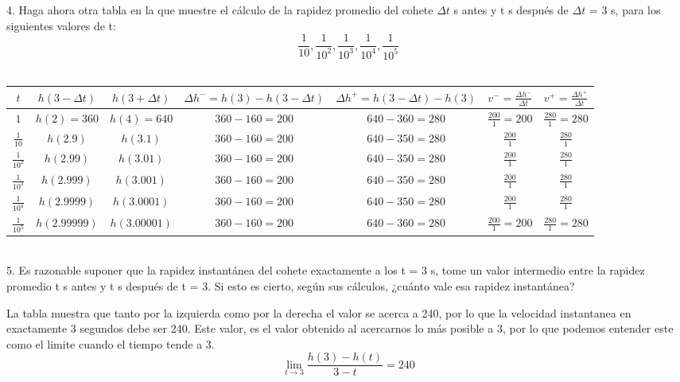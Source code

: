 \documentclass[12pt]{article}
\begin{document}
4. Haga ahora otra tabla en la que muestre el cálculo de la rapidez promedio del cohete $\Delta t$ s antes y t s después de $\Delta t $ = 3 s, para los siguientes valores de t:
\[
\frac{1}{10},\frac{1}{10 ^ 2} , \frac{1}{10 ^ 3}, \frac{1}{10 ^ 4}, \frac{1}{10 ^ 5}
\]
\\
\resizebox{14cm}{!} {
\begin{tabular}{||c c c c c c c||} 
 \hline
  $t$ & $h(3- \Delta t)$ &  $h(3+ \Delta t)$ &  $\Delta h^-= h(3)-h(3- \Delta t)$ & $\Delta h^+ = h(3- \Delta t) - h(3)$ & $v^- =\frac{\Delta h^-}{\Delta t}$  & $v^+ =\frac{\Delta h^+}{\Delta t}$  \\ [0.5ex] 
 \hline\hline
 $ 1$ 	& $h(2)=360$ & $h(4)=640$ & $360-160=200$ &  $640-360=280$ & $ \frac{200}{1}=200$ & $\frac{280}{1}=280$  \\ 
$ \frac{1}{10}$ & $h(2.9)$ & $h(3.1)$ & $360-160=200$ &  $640-350=280$ & $ \frac{200}{1}$ & $\frac{280}{1}$  \\ 
$ \frac{1}{10^2}$ & $h(2.99)$ & $h(3.01)$ & $360-160=200$ &  $640-350=280$ & $ \frac{200}{1}$ & $\frac{280}{1}$  \\ 
$ \frac{1}{10^3}$ & $h(2.999)$ & $h(3.001)$ & $360-160=200$ &  $640-350=280$ & $ \frac{200}{1}$ & $\frac{280}{1}$  \\ 
$ \frac{1}{10^4}$ & $h(2.9999)$ & $h(3.0001)$ & $360-160=200$ &  $640-350=280$ & $ \frac{200}{1}$ & $\frac{280}{1}$  \\
$ \frac{1}{10^5}$ 	& $h(2.99999)$ & $h(3.00001)$ & $360-160=200$ &  $640-360=280$ & $ \frac{200}{1}=200$ & $\frac{280}{1}=280$  \\ [1ex] 
\hline
\end{tabular}
}
\\

5. Es razonable suponer que la rapidez instantánea del cohete exactamente a los t = 3 s, tome un valor intermedio entre la rapidez promedio t s antes y t s después de t = 3. Si esto es cierto, según sus cálculos, ¿cuánto vale esa rapidez instantánea?

La tabla muestra que tanto por la izquierda como por la derecha el valor se acerca a 240, por lo que la velocidad instantanea en exactamente 3 segundos debe ser 240. Este valor, es el valor obtenido al acercarnos lo más posible a 3, por lo que podemos entender este como el limite cuando el tiempo tende a 3. 
\[
\lim_{t \to 3 }\frac{h(3)-h(t)}{3-t}=240
\]
\clearpage

\end{document}
